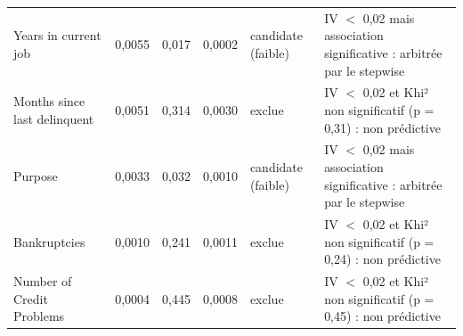 \begin{tabular}{lrrrlp{6.2cm}}
Years in current job & 0,0055 & 0,017 & 0,0002 & candidate (faible) & IV $<$ 0,02 mais association significative : arbitrée par le stepwise \\
Months since last delinquent & 0,0051 & 0,314 & 0,0030 & exclue & IV $<$ 0,02 et Khi² non significatif (p = 0,31) : non prédictive \\
Purpose & 0,0033 & 0,032 & 0,0010 & candidate (faible) & IV $<$ 0,02 mais association significative : arbitrée par le stepwise \\
Bankruptcies & 0,0010 & 0,241 & 0,0011 & exclue & IV $<$ 0,02 et Khi² non significatif (p = 0,24) : non prédictive \\
Number of Credit Problems & 0,0004 & 0,445 & 0,0008 & exclue & IV $<$ 0,02 et Khi² non significatif (p = 0,45) : non prédictive \\
\bottomrule
\end{tabular}
